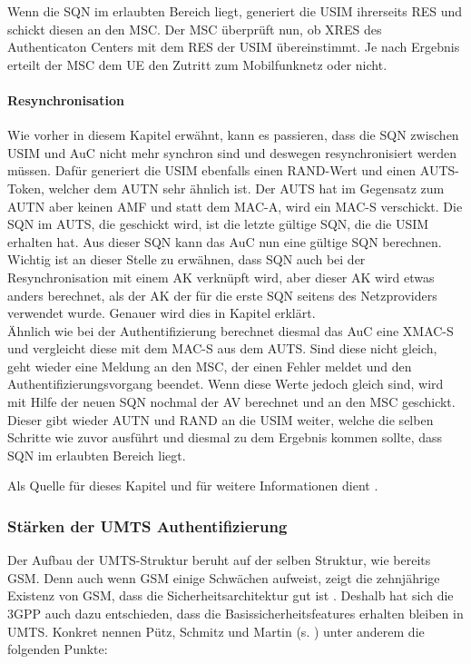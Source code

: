 Wenn die SQN im erlaubten Bereich liegt, generiert die USIM ihrerseits RES und schickt diesen an
 den MSC. Der MSC überprüft nun, ob XRES des Authenticaton Centers mit dem RES der USIM
 übereinstimmt. Je nach Ergebnis erteilt der MSC dem \ac{UE} den Zutritt zum Mobilfunknetz oder
 nicht.
 
 \paragraph{Resynchronisation}
 \label{par:resynchronisation}
  Wie vorher in diesem Kapitel erwähnt, kann es passieren, dass die SQN zwischen USIM und AuC
  nicht mehr synchron sind und deswegen resynchronisiert werden müssen. Dafür generiert die
  USIM ebenfalls einen RAND-Wert und einen AUTS-Token, welcher dem AUTN sehr ähnlich ist.
  Der AUTS hat im Gegensatz zum AUTN aber keinen AMF und statt dem MAC-A, wird ein MAC-S
  verschickt. Die SQN im AUTS, die geschickt wird, ist die letzte gültige SQN, die die USIM erhalten
  hat. Aus dieser SQN kann das AuC nun eine gültige SQN berechnen. Wichtig ist an dieser
  Stelle zu erwähnen, dass SQN auch bei der Resynchronisation mit einem AK verknüpft wird,
  aber dieser AK wird etwas anders berechnet, als der AK der für die erste SQN seitens des
  Netzproviders verwendet wurde. Genauer wird dies in Kapitel 
  erklärt.\\
  Ähnlich wie bei der Authentifizierung berechnet diesmal das AuC eine XMAC-S und vergleicht
  diese mit dem MAC-S aus dem AUTS. Sind diese nicht gleich, geht wieder eine Meldung an den
  MSC, der einen Fehler meldet und den Authentifizierungsvorgang beendet. Wenn diese Werte
  jedoch gleich sind, wird mit Hilfe der neuen SQN nochmal der AV berechnet und an den MSC
  geschickt. Dieser gibt wieder AUTN und RAND an die USIM weiter, welche die selben Schritte
  wie zuvor ausführt und diesmal zu dem Ergebnis kommen sollte, dass SQN im erlaubten
  Bereich liegt.
  
  Als Quelle für dieses Kapitel und für weitere Informationen dient \cite{3gpp.33.102}.
  
 \subsubsection[Stärken der UMTS Authentifizierung (Heumann)]{Stärken der UMTS Authentifizierung}
 Der Aufbau der \ac{UMTS}-Struktur beruht auf der selben Struktur, wie bereits \ac{GSM}.
 Denn auch wenn GSM einige Schwächen aufweist, zeigt die zehnjährige Existenz von GSM,
 dass die Sicherheitsarchitektur gut ist \cite{putz01}. Deshalb hat sich die \ac{3GPP} auch
 dazu entschieden, dass die Basis\-sicherheits\-features erhalten bleiben in UMTS. Konkret
 nennen Pütz, Schmitz und Martin (s. \cite{putz01}) unter anderem die folgenden Punkte:
 
